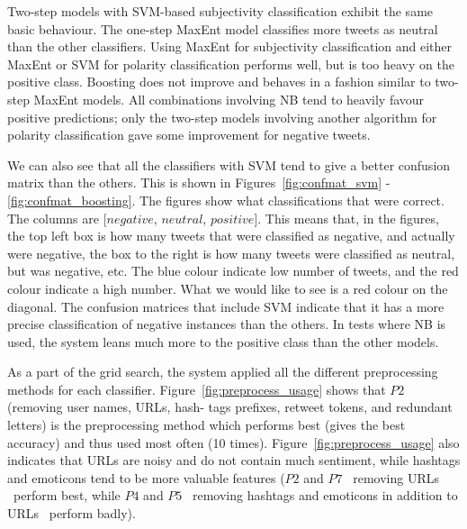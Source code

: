 Two-step models with SVM-based subjectivity classification exhibit the same basic behaviour. The one-step MaxEnt model classifies more tweets as neutral than the other classifiers. Using MaxEnt for subjectivity classification and either MaxEnt or SVM for polarity classification performs well, but is too heavy on the positive class. Boosting does not improve and behaves in a fashion similar to two-step MaxEnt models. All combinations involving NB tend to heavily favour positive predictions; only the two-step models involving another algorithm for polarity classification gave some improvement for negative tweets.

We can also see that all the classifiers with SVM tend to give a better confusion matrix than the others. This is shown in Figures~\ref{fig:confmat_svm} - \ref{fig:confmat_boosting}. The figures show what classifications that were correct. The columns are [$negative$, $neutral$, $positive$]. This means that, in the figures, the top left box is how many tweets that were classified as negative, and actually were negative, the box to the right is how many tweets were classified as neutral, but was negative, etc. The blue colour indicate low number of tweets, and the red colour indicate a high number. What we would like to see is a red colour on the diagonal. The confusion matrices that include SVM indicate that it has a more precise classification of negative instances than the others. In tests where NB is used, the system leans much more to the positive class than the other models.

As a part of the grid search, the system applied all the different preprocessing methods for each classifier. Figure~\ref{fig:preprocess_usage} shows that $P2$ (removing user names, URLs, hash- tags prefixes, retweet tokens, and redundant letters) is the preprocessing method which performs best (gives the best accuracy) and thus used most often (10 times). Figure~\ref{fig:preprocess_usage} also indicates that URLs are noisy and do not contain much sentiment, while hashtags and emoticons tend to be more valuable features ($P2$ and $P7$ \textemdash~removing URLs \textemdash~perform best, while $P4$ and $P5$ \textemdash~removing hashtags and emoticons in addition to URLs \textemdash~perform badly).

